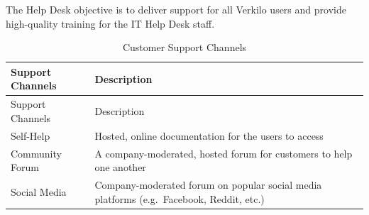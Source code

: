 \documentclass[11pt,openany]{book}
\begin{document}
The Help Desk objective is to deliver support for all Verkilo users and
provide high-quality training for the IT Help Desk staff.

\begin{longtable}[]{@{}ll@{}}
\caption{Customer Support Channels}\tabularnewline
\toprule
\begin{minipage}[b]{0.26\columnwidth}\raggedright
Support Channels\strut
\end{minipage} & \begin{minipage}[b]{0.68\columnwidth}\raggedright
Description\strut
\end{minipage}\tabularnewline
\midrule
\endfirsthead
\toprule
\begin{minipage}[b]{0.26\columnwidth}\raggedright
Support Channels\strut
\end{minipage} & \begin{minipage}[b]{0.68\columnwidth}\raggedright
Description\strut
\end{minipage}\tabularnewline
\midrule
\endhead
\begin{minipage}[t]{0.26\columnwidth}\raggedright
Self-Help\strut
\end{minipage} & \begin{minipage}[t]{0.68\columnwidth}\raggedright
Hosted, online documentation for the users to access\strut
\end{minipage}\tabularnewline
\begin{minipage}[t]{0.26\columnwidth}\raggedright
Community Forum\strut
\end{minipage} & \begin{minipage}[t]{0.68\columnwidth}\raggedright
A company-moderated, hosted forum for customers to help one
another\strut
\end{minipage}\tabularnewline
\begin{minipage}[t]{0.26\columnwidth}\raggedright
Social Media\strut
\end{minipage} & \begin{minipage}[t]{0.68\columnwidth}\raggedright
Company-moderated forum on popular social media platforms
(e.g.~Facebook, Reddit, etc.)\strut
\end{minipage}\tabularnewline
\bottomrule
\end{longtable}
\end{document}
